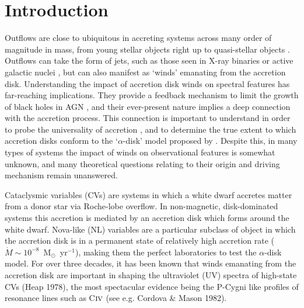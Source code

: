 \documentclass[preprint, a4paper, 11pt]{aastex}
\begin{document}
\maketitle


%
%

\section{Introduction} 

Outflows are
close to ubiquitous  in accreting systems across many order of magnitude in mass,
from young stellar objects \citep{bunn1995} right up 
to quasi-stellar objects \citep[QSOs;][]{ganguly2008}. Outflows can take the form of jets, such as those
seen in X-ray binaries \citep{fender2006} or active galactic nuclei \citep[AGN;][]{marscher2006}, but can also manifest as `winds' emanating from
the accretion disk.
Understanding the impact of accretion disk winds on spectral features has far-reaching implications. 
They provide a feedback mechanism to limit the growth of black holes in AGN \citep{silkrees1998},
and their ever-present nature implies a deep connection with the accretion process. This connection
is important to understand in order to probe the universality of accretion \citep{mchardy2006, SKUK2012}, 
and to determine the true extent to which
accretion disks conform to the `$\alpha$-disk' model proposed by 
\cite{shakurasunyaev1973}. 
Despite this, in many types of systems the impact of winds on observational
features is somewhat unknown, and many theoretical questions relating to their origin 
and driving mechanism remain unanswered.

Cataclysmic variables (CVs) are systems in which a white dwarf accretes matter from a donor
star via Roche-lobe overflow. In non-magnetic, disk-dominated systems this accretion
is mediated by an accretion disk which forms around the white dwarf. 
Nova-like (NL) variables are a particular subclass of object in which the accretion disk
is in a permanent state of relatively high accretion rate 
($\dot{M} \sim 10^{-8}$~M$_{\odot}$~yr$^{-1}$),
making them the perfect laboratories to test the $\alpha$-disk model.
For over three decades, it has been known that winds emanating from the accretion disk
are important in shaping the ultraviolet (UV) spectra of high-state CVs (Heap 1978), 
the most spectacular evidence being the P-Cygni like profiles of resonance lines such as 
C${\textsc {iv}}$ (see e.g. Cordova \& Mason 1982\nocite{cordova1982}).
\end{document}
